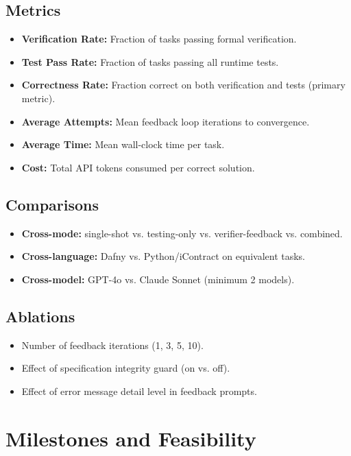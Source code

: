 \documentclass[11pt,a4paper]{article}
\begin{document}
\subsection{Metrics}
\begin{itemize}[noitemsep]
    \item \textbf{Verification Rate:} Fraction of tasks passing formal verification.
    \item \textbf{Test Pass Rate:} Fraction of tasks passing all runtime tests.
    \item \textbf{Correctness Rate:} Fraction correct on both verification and tests (primary metric).
    \item \textbf{Average Attempts:} Mean feedback loop iterations to convergence.
    \item \textbf{Average Time:} Mean wall-clock time per task.
    \item \textbf{Cost:} Total API tokens consumed per correct solution.
\end{itemize}

\subsection{Comparisons}
\begin{itemize}[noitemsep]
    \item \textbf{Cross-mode:} single-shot vs. testing-only vs. verifier-feedback vs. combined.
    \item \textbf{Cross-language:} Dafny vs. Python/iContract on equivalent tasks.
    \item \textbf{Cross-model:} GPT-4o vs. Claude Sonnet (minimum 2 models).
\end{itemize}

\subsection{Ablations}
\begin{itemize}[noitemsep]
    \item Number of feedback iterations (1, 3, 5, 10).
    \item Effect of specification integrity guard (on vs. off).
    \item Effect of error message detail level in feedback prompts.
\end{itemize}

\section{Milestones and Feasibility}
\end{document}
